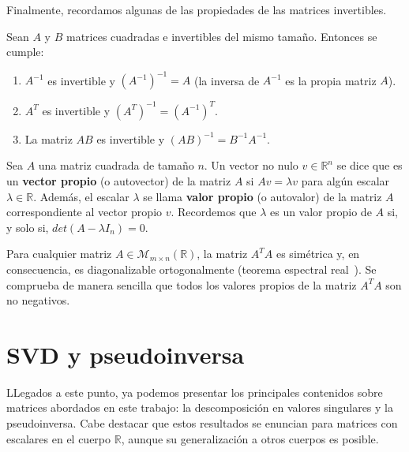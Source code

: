 Finalmente, recordamos algunas de las propiedades de las matrices invertibles.

\begin{proposicion}
    Sean $A$ y $B$ matrices cuadradas e invertibles del mismo tamaño. Entonces se cumple:

    \begin{enumerate}
        \item $A^{-1}$ es invertible y ${(A^{-1})}^{-1} = A$ (la inversa de $A^{-1}$ es la propia matriz $A$).
        \item $A^{T}$ es invertible y ${(A^{T})}^{-1} = {(A^{-1})}^{T}$.
        \item La matriz $AB$ es invertible y ${(AB)}^{-1} = B^{-1}A^{-1}$.\newline
    \end{enumerate}
\end{proposicion}

\begin{definicion}
    Sea $A$ una matriz cuadrada de tamaño $n$. Un vector no nulo $v \in \mathbb{R}^{n}$ se dice que es un \textbf{vector propio} (o autovector) de la matriz $A$ si $Av=\lambda v$ para algún escalar $\lambda \in \mathbb{R}$. Además, el escalar $\lambda$ se llama \textbf{valor propio} (o autovalor) de la matriz $A$ correspondiente al vector propio $v$. Recordemos que $\lambda$ es un valor propio de $A$ si, y solo si, $det(A-\lambda I_n)=0$.\newline
\end{definicion}

Para cualquier matriz $A \in \mathcal{M}_{m \times n}(\mathbb{R})$, la matriz $A^{T}A$ es simétrica y, en consecuencia, es diagonalizable ortogonalmente (teorema espectral real~\cite{Blum2021}). Se comprueba de manera sencilla que todos los valores propios de la matriz $A^{T}A$ son no negativos.

\section{SVD y pseudoinversa}\label{sec:svd-pseudoinversa}

LLegados a este punto, ya podemos presentar los principales contenidos sobre matrices abordados en este trabajo: la descomposición en valores singulares y la pseudoinversa. Cabe destacar que estos resultados se enuncian para matrices con escalares en el cuerpo $\mathbb{R}$, aunque su generalización a otros cuerpos es posible.\newline

